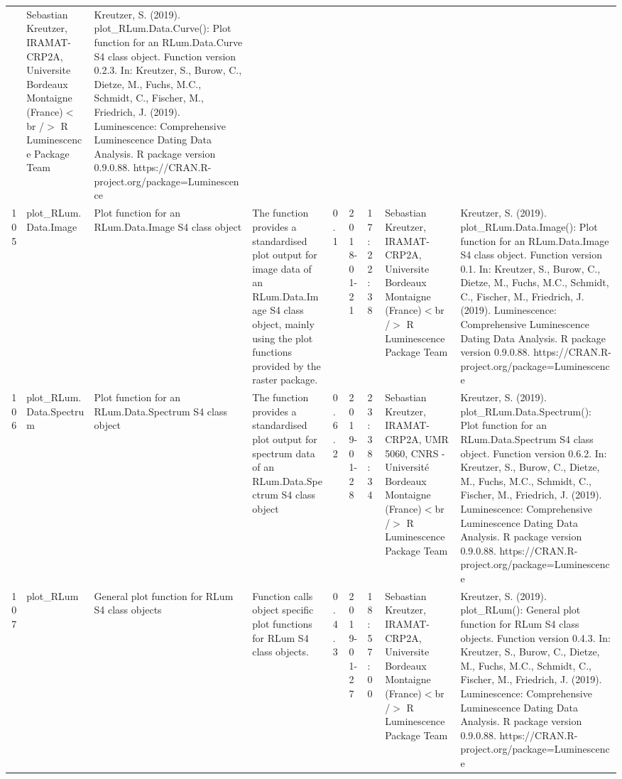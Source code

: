 \begin{table}[ht]
\begin{tabular}{rllllllll}
 & Sebastian Kreutzer, IRAMAT-CRP2A, Universite Bordeaux Montaigne (France)$<$br /$>$  R Luminescence Package Team & Kreutzer, S. (2019). plot\_RLum.Data.Curve(): Plot function for an RLum.Data.Curve S4 class object. Function version 0.2.3. In: Kreutzer, S., Burow, C., Dietze, M., Fuchs, M.C., Schmidt, C., Fischer, M., Friedrich, J. (2019). Luminescence: Comprehensive Luminescence Dating Data Analysis. R package version 0.9.0.88. https://CRAN.R-project.org/package=Luminescence
 \\ 
  105 & plot\_RLum.Data.Image & Plot function for an  RLum.Data.Image  S4 class object & The function provides a standardised plot output for image data of an RLum.Data.Image S4 class object, mainly using the plot functions provided by the  raster  package. & 0.1 & 2018-01-21 & 17:22:38
 & Sebastian Kreutzer, IRAMAT-CRP2A, Universite Bordeaux Montaigne (France)$<$br /$>$  R Luminescence Package Team & Kreutzer, S. (2019). plot\_RLum.Data.Image(): Plot function for an RLum.Data.Image S4 class object. Function version 0.1. In: Kreutzer, S., Burow, C., Dietze, M., Fuchs, M.C., Schmidt, C., Fischer, M., Friedrich, J. (2019). Luminescence: Comprehensive Luminescence Dating Data Analysis. R package version 0.9.0.88. https://CRAN.R-project.org/package=Luminescence
 \\ 
  106 & plot\_RLum.Data.Spectrum & Plot function for an RLum.Data.Spectrum S4 class object & The function provides a standardised plot output for spectrum data of an RLum.Data.Spectrum S4 class object & 0.6.2 & 2019-01-28 & 23:38:34
 & Sebastian Kreutzer, IRAMAT-CRP2A, UMR 5060, CNRS - Université Bordeaux Montaigne (France)$<$br /$>$  R Luminescence Package Team & Kreutzer, S. (2019). plot\_RLum.Data.Spectrum(): Plot function for an RLum.Data.Spectrum S4 class object. Function version 0.6.2. In: Kreutzer, S., Burow, C., Dietze, M., Fuchs, M.C., Schmidt, C., Fischer, M., Friedrich, J. (2019). Luminescence: Comprehensive Luminescence Dating Data Analysis. R package version 0.9.0.88. https://CRAN.R-project.org/package=Luminescence
 \\ 
  107 & plot\_RLum & General plot function for RLum S4 class objects & Function calls object specific plot functions for RLum S4 class objects. & 0.4.3 & 2019-01-27 & 18:57:00
 & Sebastian Kreutzer, IRAMAT-CRP2A, Universite Bordeaux Montaigne (France)$<$br /$>$  R Luminescence Package Team & Kreutzer, S. (2019). plot\_RLum(): General plot function for RLum S4 class objects. Function version 0.4.3. In: Kreutzer, S., Burow, C., Dietze, M., Fuchs, M.C., Schmidt, C., Fischer, M., Friedrich, J. (2019). Luminescence: Comprehensive Luminescence Dating Data Analysis. R package version 0.9.0.88. https://CRAN.R-project.org/package=Luminescence

\end{tabular}
\end{table}
